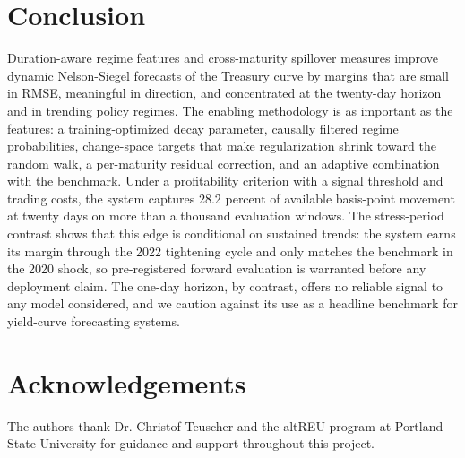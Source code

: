 \documentclass[10pt]{article}
\begin{document}
\section{Conclusion}

Duration-aware regime features and cross-maturity spillover measures improve dynamic Nelson-Siegel forecasts of the Treasury curve by margins that are small in RMSE, meaningful in direction, and concentrated at the twenty-day horizon and in trending policy regimes. The enabling methodology is as important as the features: a training-optimized decay parameter, causally filtered regime probabilities, change-space targets that make regularization shrink toward the random walk, a per-maturity residual correction, and an adaptive combination with the benchmark. Under a profitability criterion with a signal threshold and trading costs, the system captures 28.2 percent of available basis-point movement at twenty days on more than a thousand evaluation windows. The stress-period contrast shows that this edge is conditional on sustained trends: the system earns its margin through the 2022 tightening cycle and only matches the benchmark in the 2020 shock, so pre-registered forward evaluation is warranted before any deployment claim. The one-day horizon, by contrast, offers no reliable signal to any model considered, and we caution against its use as a headline benchmark for yield-curve forecasting systems.

\section*{Acknowledgements}
The authors thank Dr. Christof Teuscher and the altREU program at Portland State University for guidance and support throughout this project.
\end{document}

